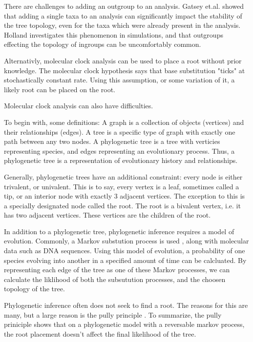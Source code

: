 \documentclass{article}
\begin{document}
There are challenges to adding  an  outgroup  to  an  analysis.   Gatsey  et.al.
\cite{gatesy_how_2007} showed that adding a  single  taxa  to  an  analysis  can
significantly impact the stability of the tree topology, even for the taxa which
were already present  in  the  analysis.   Holland  \cite{holland_outgroup_2003}
investigates this phenomenon in simulations, and that  outgroups  effecting  the
topology of ingroups can be uncomfortably common.

Alternativly, molecular clock analysis can be used to place a root without prior
knowledge. The molecular clock hypothesis says that base substitution "ticks" at
stochastically constant rate. Using this assumption, or some variation of it, a
likely root can be placed on the root.

Molecular clock analysis can also have difficulties. 

To begin with, some definitions: A graph is a collection of objects (vertices)
and their relationships (edges). A tree is a specific type of graph with exactly
one path between any two nodes. A phylogenetic tree is a tree with verticies
representing species, and edges representing an evolutionary process. Thus, a
phylogenetic tree is a representation of evolutionary history and relationships. 

Generally, phylogenetic trees have an additional constraint: every node is
either trivalent, or univalent. This is to say, every vertex is a leaf,
sometimes called a tip, or an interior node with exactly 3 adjacent vertices.
The exception to this is a specially designated node called the root. The root
is a bivalent vertex, i.e. it has two adjacent vertices. These vertices are the
children of the root.

In addition to a phylogenetic tree, phylogenetic inference requires a model of
evolution. Commonly, a Markov substution process is used
\cite{yang_computational_2006}, along with molecular data such as DNA sequences.
Using this model of evolution, a probability of one species evolving into
another in a specified amount of time can be calcluated. By representing each
edge of the tree as one of these Markov processes, we can calculate the
liklihood of both the subsutution processes, and the choosen topology of the
tree.

Phylogenetic inference often does not seek to find a root. The reasons for this
are many, but a large reason is the pully principle
\cite{felsenstein_evolutionary_1981}. To summarize, the pully priniciple shows
that on a phylogenetic model with a reversable markov process, the root
placement doesn't affect the final likelihood of the tree.
\end{document}
